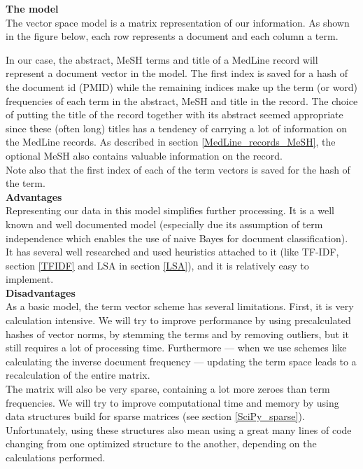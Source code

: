 \textbf{The model} \\
The vector space model is a matrix representation of our
information. As shown in the figure below, each row represents a
document and each column a term.\\


In our case, the abstract, MeSH terms and title of a MedLine record
will represent a document vector in the model. The first index is
saved for a hash of the document id (PMID) while the remaining indices
make up the term (or word) frequencies of each term in the abstract,
MeSH and title in the record. The choice of putting the title of the
record together with its abstract seemed appropriate since these
(often long) titles has a tendency of carrying a lot of information on
the MedLine records. As described in section \ref{MedLine_records_MeSH}, the
optional MeSH also contains valuable information on the record.\\

Note also that the first index of each of the term vectors is saved
for the hash of the term.\\

\textbf{Advantages} \\ 
Representing our data in this model simplifies further
processing. It is a well known and well documented model (especially
due its assumption of term independence which enables the use of naive
Bayes for document classification). It has several well researched and
used heuristics attached to it (like TF-IDF, section \ref{TFIDF} and LSA
 in section \ref{LSA}), and it is relatively easy to implement.\\

\textbf{Disadvantages} \\
As a basic model, the term vector scheme has several
limitations. First, it is very calculation intensive. We will try to
improve performance by using precalculated hashes of vector norms, by
stemming the terms and by removing outliers, but it still requires a
lot of processing time. Furthermore --- when we use schemes like
calculating the inverse document frequency --- updating the term space
leads to a recalculation of the entire matrix.\\

The matrix will also be very sparse, containing a lot more zeroes than
term frequencies. We will try to improve computational time and memory
by using data structures build for sparse matrices (see section
\ref{SciPy_sparse}). Unfortunately, using these structures also mean
using a great many lines of code changing from one optimized structure
to the another, depending on the calculations performed.\\

